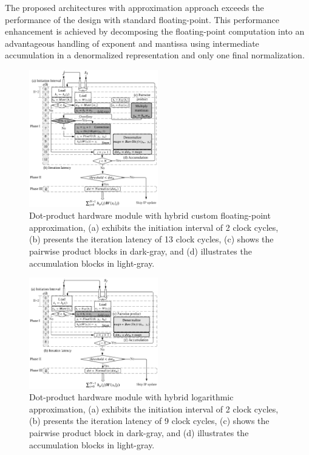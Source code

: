 The proposed architectures with approximation approach exceeds the performance of the design with standard floating-point. This performance enhancement is achieved by decomposing the floating-point computation into an advantageous handling of exponent and mantissa using intermediate accumulation in a denormalized representation and only one final normalization.

\begin{figure}[t!]
	\centering
	\includegraphics[width=0.5\textwidth]{../figures/dot_product.pdf}
	\caption{Dot-product hardware module with hybrid custom floating-point approximation, (a) exhibits the initiation interval of 2 clock cycles, (b) presents the iteration latency of 13 clock cycles, (c) shows the pairwise product blocks in dark-gray, and (d) illustrates the accumulation blocks in light-gray.}
	\label{fig:dot_product_custom}
\end{figure}

\begin{figure}[t!]
	\centering
	\includegraphics[width=0.5\textwidth]{../figures/dot_product_log.pdf}
	\caption{Dot-product hardware module with hybrid logarithmic approximation, (a) exhibits the initiation interval of 2 clock cycles, (b) presents the iteration latency of 9 clock cycles, (c) shows the pairwise product block in dark-gray, and (d) illustrates the accumulation blocks in light-gray.}
	\label{fig:dot_product_log}
\end{figure}


